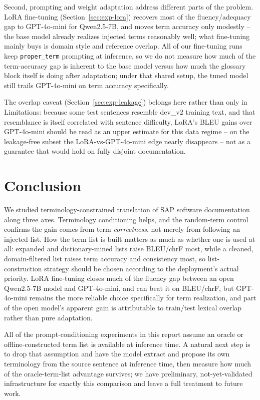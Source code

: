 \documentclass[11pt]{article}
\begin{document}
Second, prompting and weight adaptation address different parts of the problem. LoRA fine-tuning (Section~\ref{sec:exp-lora}) recovers most of the fluency/adequacy gap to GPT-4o-mini for Qwen2.5-7B, and moves term accuracy only modestly -- the base model already realizes injected terms reasonably well; what fine-tuning mainly buys is domain style and reference overlap. All of our fine-tuning runs keep \texttt{proper\_term} prompting at inference, so we do not measure how much of the term-accuracy gap is inherent to the base model versus how much the glossary block itself is doing after adaptation; under that shared setup, the tuned model still trails GPT-4o-mini on term accuracy specifically.

The overlap caveat (Section~\ref{sec:exp-leakage}) belongs here rather than only in Limitations: because some test sentences resemble dev\_v2 training text, and that resemblance is itself correlated with sentence difficulty, LoRA's BLEU gains over GPT-4o-mini should be read as an upper estimate for this data regime -- on the leakage-free subset the LoRA-vs-GPT-4o-mini edge nearly disappears -- not as a guarantee that would hold on fully disjoint documentation.

\section{Conclusion}
\label{sec:conclusion}

We studied terminology-constrained translation of SAP software documentation along three axes. Terminology conditioning helps, and the random-term control confirms the gain comes from term \emph{correctness}, not merely from following an injected list. How the term list is built matters as much as whether one is used at all: expanded and dictionary-mined lists raise BLEU/chrF most, while a cleaned, domain-filtered list raises term accuracy and consistency most, so list-construction strategy should be chosen according to the deployment's actual priority. LoRA fine-tuning closes much of the fluency gap between an open Qwen2.5-7B model and GPT-4o-mini, and can beat it on BLEU/chrF, but GPT-4o-mini remains the more reliable choice specifically for term realization, and part of the open model's apparent gain is attributable to train/test lexical overlap rather than pure adaptation.

All of the prompt-conditioning experiments in this report assume an oracle or offline-constructed term list is available at inference time. A natural next step is to drop that assumption and have the model extract and propose its own terminology from the source sentence at inference time, then measure how much of the oracle-term-list advantage survives; we have preliminary, not-yet-validated infrastructure for exactly this comparison and leave a full treatment to future work.
\end{document}
